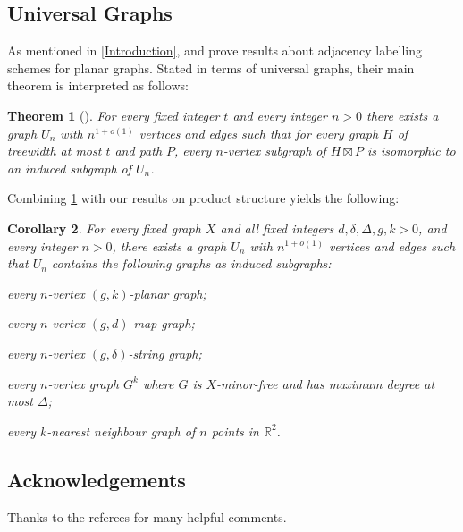 \documentclass{patmorin}
\theoremstyle{plain}
\newtheorem{thm}{Theorem}
\newtheorem{cor}[thm]{Corollary}
\theoremstyle{definition}
\newcommand{\R}{\mathbb{R}}
\begin{document}
\subsection{Universal Graphs}

As mentioned in \cref{Introduction}, \citet{DEJGMM21} and \citet{EJM} prove results about adjacency labelling schemes for planar graphs. Stated in terms of universal graphs, their main theorem is interpreted as follows:

\begin{thm}[\citep{DEJGMM21,EJM}]
  \label{Universal}
  For every fixed integer $t$ and every integer $n>0$ there exists a
  graph $U_n$ with $n^{1+o(1)}$ vertices and edges such that for every graph $H$ of treewidth at most $t$ and path $P$, every $n$-vertex subgraph of $H\boxtimes P$ is isomorphic to an induced subgraph of $U_n$.
\end{thm}

Combining \cref{Universal} with our results on product structure yields the following:


\begin{cor}\label{universal_cor}
  \label{UniversalUniversal}
  For every fixed graph $X$ and all fixed integers $d,\delta,\Delta,g,k>0$, and every integer $n>0$, there exists a graph $U_n$ with $n^{1+o(1)}$ vertices and edges such that $U_n$ contains the following graphs as induced subgraphs:
  \begin{compactitem}
    \item every $n$-vertex $(g,k)$-planar graph;
    \item every $n$-vertex $(g,d)$-map graph;
    \item every $n$-vertex $(g,\delta)$-string graph;
    \item every $n$-vertex graph $G^k$ where $G$ is $X$-minor-free and has maximum degree at most $\Delta$;
    \item every $k$-nearest neighbour graph of $n$ points in $\R^2$.
  \end{compactitem}
\end{cor}

\subsection*{Acknowledgements} Thanks to the referees for many helpful comments.

   \let\oldthebibliography=\thebibliography
   \let\endoldthebibliography=\endthebibliography
   \renewenvironment{thebibliography}[1]{%
     \begin{oldthebibliography}{#1}%
       \setlength{\parskip}{0ex}%
       \setlength{\itemsep}{0ex}%
   }{\end{oldthebibliography}}



\end{document}
